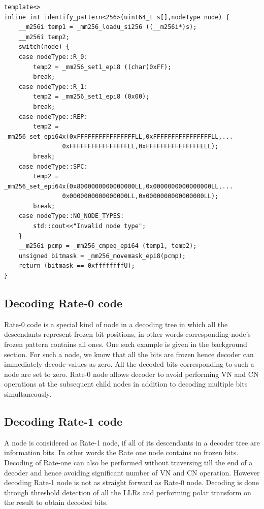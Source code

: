 \begin{code}
	\label{code:rateOneSIMDComparison}
	\begin{verbatim}
template<>
inline int identify_pattern<256>(uint64_t s[],nodeType node) {
	__m256i temp1 = _mm256_loadu_si256 ((__m256i*)s);
	__m256i temp2;
	switch(node) {
	case nodeType::R_0:
		temp2 = _mm256_set1_epi8 ((char)0xFF);
		break;
	case nodeType::R_1:
		temp2 = _mm256_set1_epi8 (0x00);
		break;
	case nodeType::REP:
		temp2 = _mm256_set_epi64x(0xFFFFFFFFFFFFFFFFLL,0xFFFFFFFFFFFFFFFFLL,...
				0xFFFFFFFFFFFFFFFFLL,0xFFFFFFFFFFFFFFFELL);
		break;
	case nodeType::SPC:
		temp2 = _mm256_set_epi64x(0x8000000000000000LL,0x0000000000000000LL,...
				0x0000000000000000LL,0x0000000000000000LL);
		break;
	case nodeType::NO_NODE_TYPES:
		std::cout<<"Invalid node type";
	}
	__m256i pcmp = _mm256_cmpeq_epi64 (temp1, temp2);
	unsigned bitmask = _mm256_movemask_epi8(pcmp);
	return (bitmask == 0xffffffffU);
}
\end{verbatim}
\end{code}

\subsection{Decoding Rate-0 code}
Rate-0 code is a special kind of node in a decoding tree in which all the descendants represent frozen bit positions, in other words corresponding node's frozen pattern contains all ones. One such example is given in the background section. For such a node, we know that all the bits are frozen hence decoder can immediately decode values as zero. All the decoded bits corresponding to such a node are set to zero. Rate-0 node allows decoder to avoid performing VN and CN operations at the subsequent child nodes in addition to decoding multiple bits simultaneously.

\subsection{Decoding Rate-1 code}
A node is considered as Rate-1 node, if all of its descendants in a decoder tree are information bits. In other words the Rate one node contains no frozen bits. Decoding of Rate-one can also be performed without traversing till the end of a decoder and hence avoiding significant number of VN and CN operation. However decoding Rate-1 node is not as straight forward as Rate-0 node. Decoding is done through threshold detection of all the LLRs and performing polar transform on the result to obtain decoded bits.

